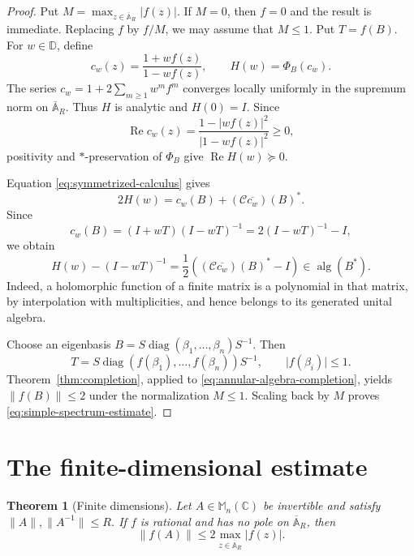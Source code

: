 \documentclass[preprints,article,submit,oneauthor]{Definitions/mdpi}
\newcounter{manuscriptresult}[section]
\theoremstyle{mdpi}
\newtheorem{theorem}[manuscriptresult]{Theorem}
\theoremstyle{definition}
\newcommand{\C}{\mathbb C}
\newcommand{\D}{\mathbb D}
\newcommand{\Mn}{\mathbb M_n(\C)}
\newcommand{\alg}{\operatorname{alg}}
\newcommand{\RePart}{\operatorname{Re}}
\newcommand{\diag}{\operatorname{diag}}
\begin{document}
\begin{proof}
Put
$M=\max_{z\in\overline{\mathbb A}_R}\lvert f(z)\rvert$.
If $M=0$, then $f=0$ and the result is immediate.  Replacing $f$ by
$f/M$, we may assume that $M\leq1$.
Put $T=f(B)$.  For $w\in\D$, define
\begin{equation}
  c_w(z)=\frac{1+w f(z)}{1-w f(z)},
  \qquad
  H(w)=\Phi_B(c_w).
  \label{eq:Cayley-family}
\end{equation}
The series
$c_w=1+2\sum_{m\geq1}w^m f^m$ converges locally uniformly in the
supremum norm on $\overline{\mathbb A}_R$.  Thus $H$ is analytic and
$H(0)=I$.  Since
\[
  \RePart c_w(z)
  =\frac{1-\lvert w f(z)\rvert^2}
  {\lvert1-w f(z)\rvert^2}\geq0,
\]
positivity and $*$-preservation of $\Phi_B$ give
$\RePart H(w)\succeq0$.

Equation \eqref{eq:symmetrized-calculus} gives
\begin{equation}
  2H(w)=c_w(B)+(\mathcal C\overline{c_w})(B)^*.
  \label{eq:Cayley-symmetrization}
\end{equation}
Since
\[
  c_w(B)=(I+wT)(I-wT)^{-1}
  =2(I-wT)^{-1}-I,
\]
we obtain
\begin{equation}
  H(w)-(I-wT)^{-1}
  =\frac12\left((\mathcal C\overline{c_w})(B)^*-I\right)
  \in\alg(B^*).
  \label{eq:annular-algebra-completion}
\end{equation}
Indeed, a holomorphic function of a finite matrix is a polynomial in
that matrix, by interpolation with multiplicities, and hence belongs
to its generated unital algebra.

Choose an eigenbasis
$B=S\diag(\beta_1,\ldots,\beta_n)S^{-1}$.  Then
\[
  T=S\diag(f(\beta_1),\ldots,f(\beta_n))S^{-1},
  \qquad \lvert f(\beta_i)\rvert\leq1.
\]
Theorem~\ref{thm:completion}, applied to
\eqref{eq:annular-algebra-completion}, yields
$\lVert f(B)\rVert\leq2$ under the normalization $M\leq1$.
Scaling back by $M$ proves \eqref{eq:simple-spectrum-estimate}.
\end{proof}

\section{The finite-dimensional estimate}
\label{sec:finite-dimensions}

\begin{theorem}[Finite dimensions]
\label{thm:finite-dimensional}
Let $A\in\Mn$ be invertible and satisfy
$\lVert A\rVert,\lVert A^{-1}\rVert\leq R$.  If $f$ is rational and
has no pole on $\overline{\mathbb A}_R$, then
\begin{equation}
  \lVert f(A)\rVert
  \leq2\max_{z\in\overline{\mathbb A}_R}\lvert f(z)\rvert.
  \label{eq:finite-dimensional-estimate}
\end{equation}
\end{theorem}
\end{document}
